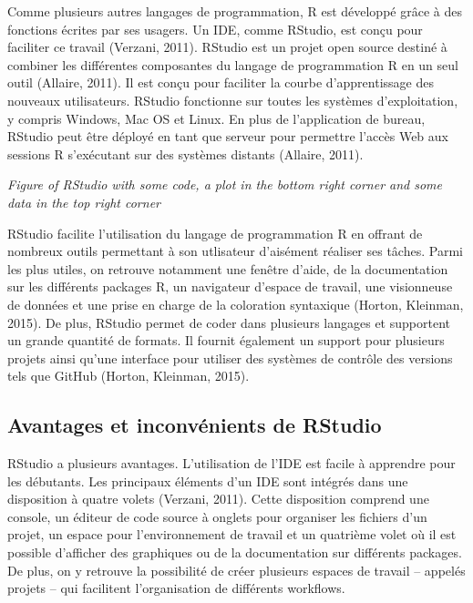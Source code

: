 \documentclass[
  letterpaper,
]{scrbook}
\begin{document}
Comme plusieurs autres langages de programmation, R est développé grâce
à des fonctions écrites par ses usagers. Un IDE, comme RStudio, est
conçu pour faciliter ce travail (Verzani, 2011). RStudio est un projet
open source destiné à combiner les différentes composantes du langage de
programmation R en un seul outil (Allaire, 2011). Il est conçu pour
faciliter la courbe d'apprentissage des nouveaux utilisateurs. RStudio
fonctionne sur toutes les systèmes d'exploitation, y compris Windows,
Mac OS et Linux. En plus de l'application de bureau, RStudio peut être
déployé en tant que serveur pour permettre l'accès Web aux sessions R
s'exécutant sur des systèmes distants (Allaire, 2011).

\emph{Figure of RStudio with some code, a plot in the bottom right
corner and some data in the top right corner}

RStudio facilite l'utilisation du langage de programmation R en offrant
de nombreux outils permettant à son utlisateur d'aisément réaliser ses
tâches. Parmi les plus utiles, on retrouve notamment une fenêtre d'aide,
de la documentation sur les différents packages R, un navigateur
d'espace de travail, une visionneuse de données et une prise en charge
de la coloration syntaxique (Horton, Kleinman, 2015). De plus, RStudio
permet de coder dans plusieurs langages et supportent un grande quantité
de formats. Il fournit également un support pour plusieurs projets ainsi
qu'une interface pour utiliser des systèmes de contrôle des versions
tels que GitHub (Horton, Kleinman, 2015).

\hypertarget{avantages-et-inconvuxe9nients-de-rstudio}{%
\subsection{Avantages et inconvénients de
RStudio}\label{avantages-et-inconvuxe9nients-de-rstudio}}

RStudio a plusieurs avantages. L'utilisation de l'IDE est facile à
apprendre pour les débutants. Les principaux éléments d'un IDE sont
intégrés dans une disposition à quatre volets (Verzani, 2011). Cette
disposition comprend une console, un éditeur de code source à onglets
pour organiser les fichiers d'un projet, un espace pour l'environnement
de travail et un quatrième volet où il est possible d'afficher des
graphiques ou de la documentation sur différents packages. De plus, on y
retrouve la possibilité de créer plusieurs espaces de travail -- appelés
projets -- qui facilitent l'organisation de différents workflows.
\end{document}
